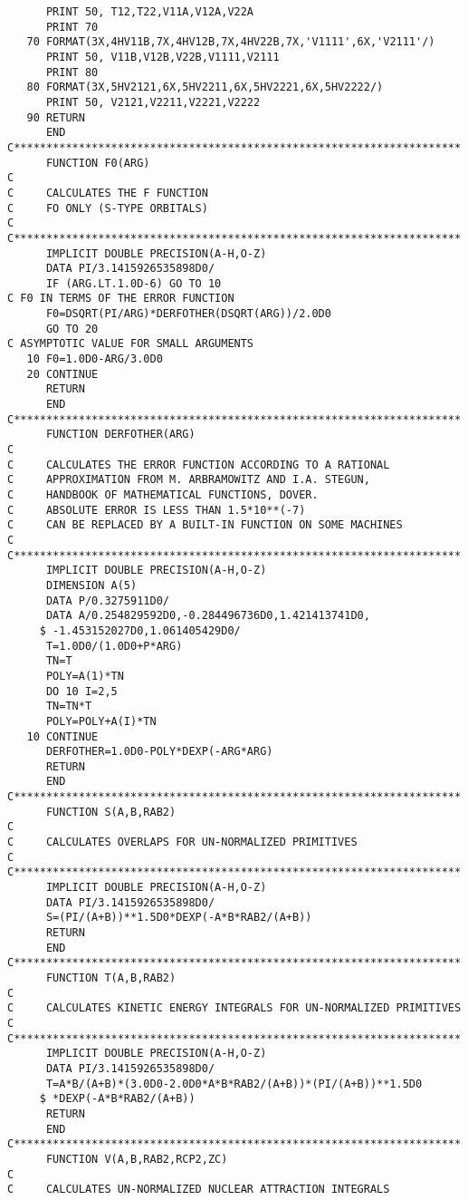 \begin{verbatim}
      PRINT 50, T12,T22,V11A,V12A,V22A
      PRINT 70
   70 FORMAT(3X,4HV11B,7X,4HV12B,7X,4HV22B,7X,'V1111',6X,'V2111'/)
      PRINT 50, V11B,V12B,V22B,V1111,V2111
      PRINT 80
   80 FORMAT(3X,5HV2121,6X,5HV2211,6X,5HV2221,6X,5HV2222/)
      PRINT 50, V2121,V2211,V2221,V2222
   90 RETURN
      END
C*********************************************************************
      FUNCTION F0(ARG)
C
C     CALCULATES THE F FUNCTION
C     FO ONLY (S-TYPE ORBITALS)
C
C*********************************************************************
      IMPLICIT DOUBLE PRECISION(A-H,O-Z)
      DATA PI/3.1415926535898D0/
      IF (ARG.LT.1.0D-6) GO TO 10
C F0 IN TERMS OF THE ERROR FUNCTION
      F0=DSQRT(PI/ARG)*DERFOTHER(DSQRT(ARG))/2.0D0
      GO TO 20
C ASYMPTOTIC VALUE FOR SMALL ARGUMENTS
   10 F0=1.0D0-ARG/3.0D0
   20 CONTINUE
      RETURN
      END
C*********************************************************************
      FUNCTION DERFOTHER(ARG)
C
C     CALCULATES THE ERROR FUNCTION ACCORDING TO A RATIONAL
C     APPROXIMATION FROM M. ARBRAMOWITZ AND I.A. STEGUN,
C     HANDBOOK OF MATHEMATICAL FUNCTIONS, DOVER.
C     ABSOLUTE ERROR IS LESS THAN 1.5*10**(-7)
C     CAN BE REPLACED BY A BUILT-IN FUNCTION ON SOME MACHINES
C
C*********************************************************************
      IMPLICIT DOUBLE PRECISION(A-H,O-Z)
      DIMENSION A(5)
      DATA P/0.3275911D0/
      DATA A/0.254829592D0,-0.284496736D0,1.421413741D0,
     $ -1.453152027D0,1.061405429D0/
      T=1.0D0/(1.0D0+P*ARG)
      TN=T
      POLY=A(1)*TN
      DO 10 I=2,5
      TN=TN*T
      POLY=POLY+A(I)*TN
   10 CONTINUE
      DERFOTHER=1.0D0-POLY*DEXP(-ARG*ARG)
      RETURN
      END
C*********************************************************************
      FUNCTION S(A,B,RAB2)
C
C     CALCULATES OVERLAPS FOR UN-NORMALIZED PRIMITIVES
C
C*********************************************************************
      IMPLICIT DOUBLE PRECISION(A-H,O-Z)
      DATA PI/3.1415926535898D0/
      S=(PI/(A+B))**1.5D0*DEXP(-A*B*RAB2/(A+B))
      RETURN
      END
C*********************************************************************
      FUNCTION T(A,B,RAB2)
C
C     CALCULATES KINETIC ENERGY INTEGRALS FOR UN-NORMALIZED PRIMITIVES
C
C*********************************************************************
      IMPLICIT DOUBLE PRECISION(A-H,O-Z)
      DATA PI/3.1415926535898D0/
      T=A*B/(A+B)*(3.0D0-2.0D0*A*B*RAB2/(A+B))*(PI/(A+B))**1.5D0
     $ *DEXP(-A*B*RAB2/(A+B))
      RETURN
      END
C*********************************************************************
      FUNCTION V(A,B,RAB2,RCP2,ZC)
C
C     CALCULATES UN-NORMALIZED NUCLEAR ATTRACTION INTEGRALS

\end{verbatim}
